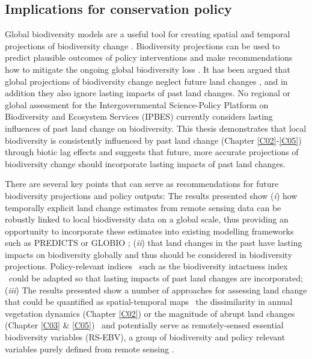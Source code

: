 \subsection{Implications for conservation policy}
\label{C06_0302}

Global biodiversity models are a useful tool for creating spatial and temporal projections of biodiversity change \citep{Pereira2010,Harfoot2014,Purvis2018}. Biodiversity projections can be used to predict plausible outcomes of policy interventions and make recommendations how to mitigate the ongoing global biodiversity loss \citep{Mace2018}. It has been argued that global projections of biodiversity change neglect future land changes \citep{Titeux2016}, and in addition they also ignore lasting impacts of past land changes. No regional or global assessment for the Intergovernmental Science-Policy Platform on Biodiversity and Ecosystem Services (IPBES) currently considers lasting influences of past land change on biodiversity. This thesis demonstrates that local biodiversity is consistently influenced by past land change (Chapter \ref{C02}-\ref{C05}) through biotic lag effects and suggests that future, more accurate projections of biodiversity change should incorporate lasting impacts of past land changes. 

There are several key points that can serve as recommendations for future biodiversity projections and policy outputs: The results presented show (\textit{i}) how temporally explicit land change estimates from remote sensing data can be robustly linked to local biodiversity data on a global scale, thus providing an opportunity to incorporate these estimates into existing modelling frameworks such as PREDICTS \citep{Newbold2015,Newbold2016a,Purvis2018} or GLOBIO \citep{Alkemade2009}; (\textit{ii}) that land changes in the past have lasting impacts on biodiversity globally and thus should be considered in biodiversity projections. Policy-relevant indices \textendash\ such as the biodiversity intactness index \citep{Newbold2016a,Purvis2018} \textendash\ could be adapted so that lasting impacts of past land changes are incorporated; (\textit{iii}) The results presented show a number of approaches for assessing land change that could be quantified as spatial-temporal maps \textendash\ \ie the dissimilarity in annual vegetation dynamics (Chapter \ref{C02}) or the magnitude of abrupt land changes (Chapter \ref{C03} \& \ref{C05}) \textendash\ and potentially serve as remotely-sensed essential biodiversity variables (RS-EBV), a group of biodiversity and policy relevant variables purely defined from remote sensing \citep{Skidmore2015,Lausch2016}.

